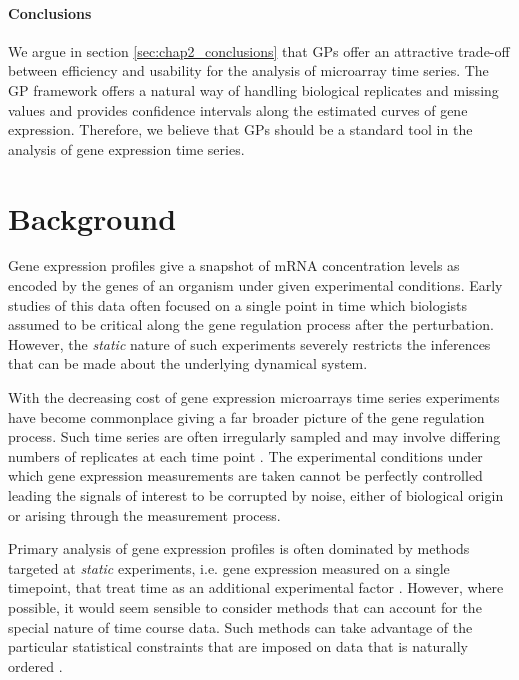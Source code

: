    \paragraph{Conclusions} %
      We argue in section \ref{sec:chap2_conclusions} that GPs offer an attractive trade-off between efficiency and usability for the analysis of microarray time series.
      The GP framework offers a natural way of handling biological replicates and missing values and provides confidence intervals along the estimated curves of gene expression.
      Therefore, we believe that GPs should be a standard tool in the analysis of gene expression time series.


  \section{Background} \label{sec:chap2_background}
    Gene expression profiles give a snapshot of mRNA concentration levels as encoded
    by the genes of an organism under given experimental conditions. Early studies
    of this data often focused on a single point in time which biologists assumed to
    be critical along the gene regulation process after the perturbation. However,
    the \textit{static} nature of such experiments severely restricts the inferences
    that can be made about the underlying dynamical system. 

    With the decreasing cost of gene expression microarrays time series experiments
    have become commonplace giving a far broader picture of the gene regulation
    process. Such time series are often irregularly sampled and may involve
    differing numbers of replicates at each time point
    \citep{lonnstedt2002replicated}. The experimental conditions under which gene
    expression measurements are taken cannot be perfectly controlled leading the
    signals of interest to be corrupted by noise, either of biological origin or
    arising through the measurement process.

    Primary analysis of gene expression profiles is often dominated by methods
    targeted at \textit{static} experiments, i.e. gene expression measured on a
    single timepoint, that treat time as an additional experimental factor
    \citep{spellman1998comprehensive, friedman2000using, dudoit2002statistical,
    kerr2000analysis, efron2001empirical,lonnstedt2002replicated}. However, where
    possible, it would seem sensible to consider methods that can account for the
    special nature of time course data. Such methods can take advantage of the
    particular statistical constraints that are imposed on data that is naturally
    ordered \citep{bar2003comparing, ernst2005clustering, storey2005significance,
    tai2006multivariate, angelini2007bayesian, angelini2008bats}.

